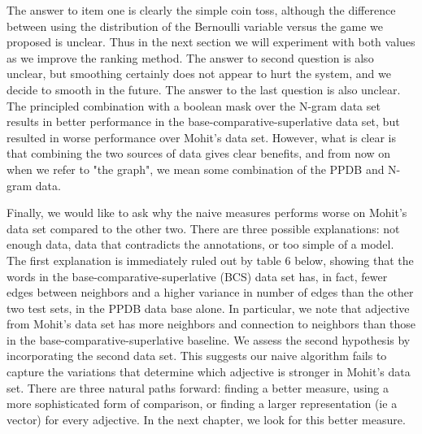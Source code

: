 The answer to item one is clearly the simple coin toss, although the difference between using the distribution of the Bernoulli variable versus the game we proposed is unclear. Thus in the next section we will experiment with both values as we improve the ranking method. The answer to second question is also unclear, but smoothing certainly does not appear to hurt the system, and we decide to smooth in the future. The answer to the last question is also unclear. The principled combination with a boolean mask over the N-gram data set results in better performance in the base-comparative-superlative data set, but resulted in worse performance over Mohit's data set. However, what is clear is that combining the two sources of data gives clear benefits, and from now on when we refer to "the graph", we mean some combination of the PPDB and N-gram data. 

Finally, we would like to ask why the naive measures performs worse on Mohit's data set compared to the other two. There are three possible explanations: not  enough data, data that contradicts the annotations, or too simple of a model. The first explanation is immediately ruled out by table 6 below, showing that the words in the base-comparative-superlative (BCS) data set has, in fact, fewer edges between neighbors and a higher variance in number of edges than the other two test sets, in the PPDB data base alone. In particular, we note that adjective from Mohit's data set has more neighbors and connection to neighbors than those in the base-comparative-superlative baseline. We assess the second hypothesis by incorporating the second data set. 
This suggests our naive algorithm fails to capture the variations that determine which adjective is stronger in Mohit's data set. There are three natural paths forward: finding a better measure, using a more sophisticated form of comparison, or finding a larger representation (ie a vector) for every adjective. In the next chapter, we look for this better measure.

